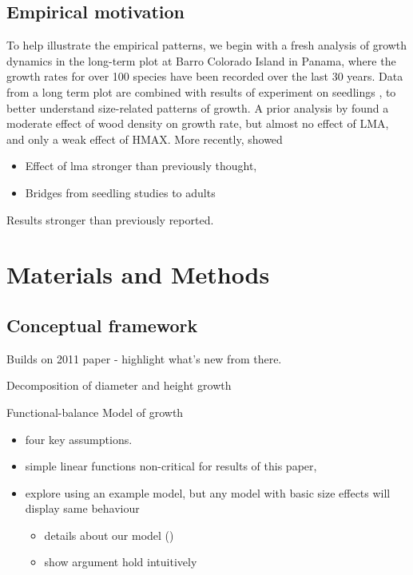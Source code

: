 \documentclass[12pt, a4paper]{article}
\begin{document}
\subsection*{Empirical motivation}\label{fresh-empirical-motivation}

To help illustrate the empirical patterns, we begin with a fresh analysis of
growth dynamics in the long-term plot at Barro Colorado Island in Panama,
where the growth rates for over 100 species have been recorded over the last
30 years. Data from a long term plot \citep{condit-2012} are combined
with results of experiment on seedlings \citep{kitajima-2013}, to better understand
size-related patterns of growth. A prior analysis by
\citet{wright-2010} found a moderate effect of wood density on
growth rate, but almost no effect of LMA, and only a weak effect of HMAX. More recently,
\citet{ruger-2012} showed

\begin{itemize}
\itemsep1pt\parskip0pt
\item
  Effect of lma stronger than previously thought,
\item
  Bridges from seedling studies to adults
\end{itemize}

Results stronger than previously reported.

\section*{Materials and Methods}\label{materials-and-methods}

\subsection*{Conceptual framework}\label{conceptual-framework}

Builds on 2011 paper - highlight what's new from there.

Decomposition of diameter and height growth

Functional-balance Model of growth

\begin{itemize}
\itemsep1pt\parskip0pt
\item
  four key assumptions.
\item
  simple linear functions non-critical for results of this paper,
\item
  explore using an example model, but any model with basic size effects
  will display same behaviour

  \begin{itemize}
  \itemsep1pt\parskip0pt
  \item
    details about our model ()
  \item
    show argument hold intuitively
  \end{itemize}
\end{itemize}
\end{document}
